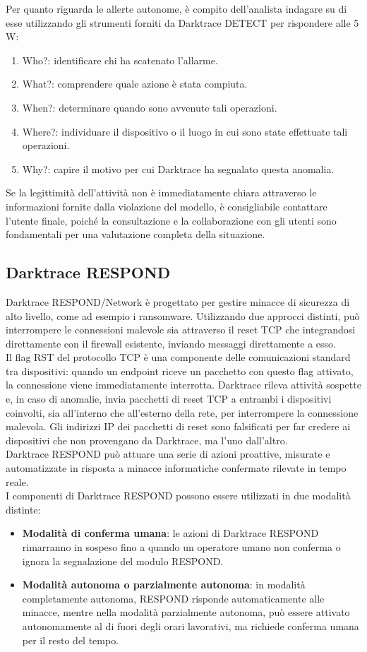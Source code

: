 \documentclass[12pt,a4paper,oneside,onecolumn,openright]{book}
\begin{document}
	Per quanto riguarda le allerte autonome, è compito dell'analista indagare su di esse utilizzando gli strumenti forniti da Darktrace DETECT per rispondere alle 5 W:
	\begin{enumerate}
		\item Who?: identificare chi ha scatenato l'allarme.
		\item What?: comprendere quale azione è stata compiuta.
		\item When?: determinare quando sono avvenute tali operazioni.
		\item Where?: individuare il dispositivo o il luogo in cui sono state effettuate tali operazioni.
		\item Why?: capire il motivo per cui Darktrace ha segnalato questa anomalia.
	\end{enumerate}
	Se la legittimità dell'attività non è immediatamente chiara attraverso le informazioni fornite dalla violazione del modello, è consigliabile contattare l'utente finale, poiché la consultazione e la collaborazione con gli utenti sono fondamentali per una valutazione completa della situazione.\cite{threat2}
	
	\subsection{Darktrace RESPOND}
	Darktrace RESPOND/Network è progettato per gestire minacce di sicurezza di alto livello, come ad esempio i ransomware. Utilizzando due approcci distinti, può interrompere le connessioni malevole sia attraverso il reset TCP che integrandosi direttamente con il firewall esistente, inviando messaggi direttamente a esso.\\
	Il flag RST del protocollo TCP è una componente delle comunicazioni standard tra dispositivi: quando un endpoint riceve un pacchetto con questo flag attivato, la connessione viene immediatamente interrotta. Darktrace rileva attività sospette e, in caso di anomalie, invia pacchetti di reset TCP a entrambi i dispositivi coinvolti, sia all'interno che all'esterno della rete, per interrompere la connessione malevola. Gli indirizzi IP dei pacchetti di reset sono falsificati per far credere ai dispositivi che non provengano da Darktrace, ma l'uno dall'altro.\\
	Darktrace RESPOND può attuare una serie di azioni proattive, misurate e automatizzate in risposta a minacce informatiche confermate rilevate in tempo reale.\\
	I componenti di Darktrace RESPOND possono essere utilizzati in due modalità distinte:
	\begin{itemize}
		\item \textbf{Modalità di conferma umana}: le azioni di Darktrace RESPOND rimarranno in 
		sospeso fino a quando un operatore umano non conferma o ignora 
		la segnalazione del modulo RESPOND.
		\item \textbf{Modalità autonoma o parzialmente autonoma}: in modalità completamente 
		autonoma, RESPOND risponde automaticamente alle minacce, mentre nella modalità 
		parzialmente autonoma, può essere attivato autonomamente al di fuori degli orari 
		lavorativi, ma richiede conferma umana per il resto del tempo.
	\end{itemize}
	
\end{document}
